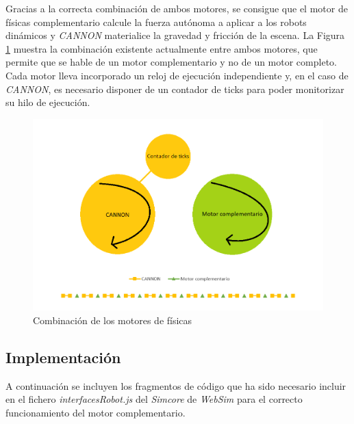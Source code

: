 \normalsize
Gracias a la correcta combinación de ambos motores, se consigue que el motor de físicas complementario calcule la fuerza autónoma a aplicar a los robots dinámicos y \textit{CANNON} materialice la gravedad y fricción de la escena. La Figura \ref{fig:combi_motor} muestra la combinación existente actualmente entre ambos motores, que permite que se hable de un motor complementario y no de un motor completo. Cada motor lleva incorporado un reloj de ejecución independiente y, en el caso de \textit{CANNON}, es necesario disponer de un contador de ticks para poder monitorizar su hilo de ejecución.

\begin{figure}[h!]
    \centering
    \includegraphics[scale=0.9]{combinacion_motores_2.PNG}
    \caption{Combinación de los motores de físicas\footnotemark}
    \label{fig:combi_motor}
\end{figure}

\subsection{Implementación}
A continuación se incluyen los fragmentos de código que ha sido necesario incluir en el fichero \textit{interfacesRobot.js} del \textit{Simcore} de \textit{WebSim} para el correcto funcionamiento del motor complementario. \newline


